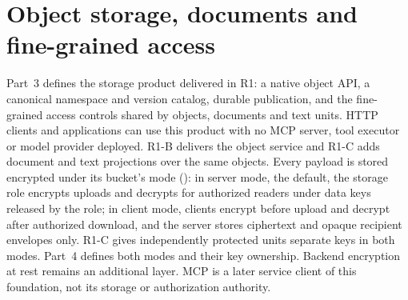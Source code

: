 \section{Object storage, documents and fine-grained access}\label{sec:content}
Part~3 defines the storage product delivered in R1: a native object API, a canonical namespace and version catalog, durable publication, and the fine-grained access controls shared by objects, documents and text units. HTTP clients and applications can use this product with no MCP server, tool executor or model provider deployed. R1-B delivers the object service and R1-C adds document and text projections over the same objects. Every payload is stored encrypted under its bucket's mode (): in server mode, the default, the storage role encrypts uploads and decrypts for authorized readers under data keys released by the  role; in client mode, clients encrypt before upload and decrypt after authorized download, and the server stores ciphertext and opaque recipient envelopes only. R1-C gives independently protected units separate keys in both modes. Part~4 defines both modes and their key ownership. Backend encryption at rest remains an additional layer. MCP is a later service client of this foundation, not its storage or authorization authority.


